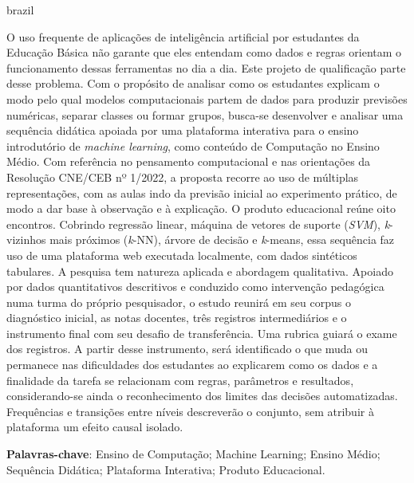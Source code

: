 \setlength{\absparsep}{18pt} 

\begin{resumo}[Resumo]
 \begin{otherlanguage*}{brazil}
   
   \vspace{\onelineskip}
   \noindent 
   
O uso frequente de aplicações de inteligência artificial por estudantes da Educação Básica não garante que eles entendam como dados e regras orientam o funcionamento dessas ferramentas no dia a dia. Este projeto de qualificação parte desse problema. Com o propósito de analisar como os estudantes explicam o modo pelo qual modelos computacionais partem de dados para produzir previsões numéricas, separar classes ou formar grupos, busca-se desenvolver e analisar uma sequência didática apoiada por uma plataforma interativa para o ensino introdutório de \textit{machine learning}, como conteúdo de Computação no Ensino Médio. Com referência no pensamento computacional e nas orientações da Resolução CNE/CEB nº 1/2022, a proposta recorre ao uso de múltiplas representações, com as aulas indo da previsão inicial ao experimento prático, de modo a dar base à observação e à explicação. O produto educacional reúne oito encontros. Cobrindo regressão linear, máquina de vetores de suporte (\textit{SVM}), \textit{k}-vizinhos mais próximos (\textit{k}-NN), árvore de decisão e \textit{k}-means, essa sequência faz uso de uma plataforma web executada localmente, com dados sintéticos tabulares. A pesquisa tem natureza aplicada e abordagem qualitativa. Apoiado por dados quantitativos descritivos e conduzido como intervenção pedagógica numa turma do próprio pesquisador, o estudo reunirá em seu corpus o diagnóstico inicial, as notas docentes, três registros intermediários e o instrumento final com seu desafio de transferência. Uma rubrica guiará o exame dos registros. A partir desse instrumento, será identificado o que muda ou permanece nas dificuldades dos estudantes ao explicarem como os dados e a finalidade da tarefa se relacionam com regras, parâmetros e resultados, considerando-se ainda o reconhecimento dos limites das decisões automatizadas. Frequências e transições entre níveis descreverão o conjunto, sem atribuir à plataforma um efeito causal isolado.
   
   \textbf{Palavras-chave}: Ensino de Computação; Machine Learning; Ensino Médio; Sequência Didática; Plataforma Interativa; Produto Educacional.

 \end{otherlanguage*}
\end{resumo}

